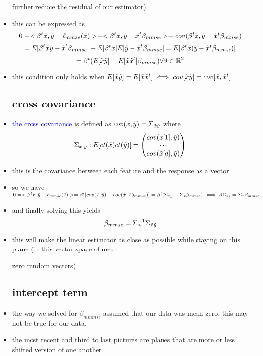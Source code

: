 \documentclass{article}
\begin{document}
\begin{itemize}
further reduce the residual of our estimator)
\item this can be expressed as $$0=<\beta^t\Tilde{x}, \Tilde{y}-\ell_{mmse}(\Tilde{x})>=
<\beta^t\Tilde{x}, \Tilde{y}-\Tilde{x}^t\beta_{mmse}>=cov(\beta^t\Tilde{x}, \Tilde{y}-\Tilde{x}^t\beta_{mmse})$$
$$=E[\beta^t\Tilde{x} \Tilde{y}-\Tilde{x}^t\beta_{mmse}]-E[\beta^t\Tilde{x}] E[\Tilde{y}-\Tilde{x}^t\beta_{mmse}]
=E[\beta^t\Tilde{x}(\Tilde{y}-\Tilde{x}^t\beta_{mmse})]$$ $$=\beta^t(E[\Tilde{x}\Tilde{y}]-E[\Tilde{x}\Tilde{x}^t]\beta_{mmse})\forall \beta \in \mathbb{R}^2$$
\item this condition only holds when $E[\Tilde{x}\Tilde{y}]=E[\Tilde{x}\Tilde{x}^t]\iff cov[\Tilde{x}\Tilde{y}]=cov[\Tilde{x} ,\Tilde{x}^t]$
\subsection*{cross covariance}
\item \textcolor{blue}{the cross covariance} is defined as $cov(\Tilde{x}, \Tilde{y})=\Sigma_{\Tilde{x}\Tilde{y}}$ where 
$$\Sigma_{\Tilde{x}, \Tilde{y}}:E[ct(\Tilde{x})ct(\Tilde{y})]=\begin{pmatrix}
    cov(\Tilde{x[1]}, \Tilde{y})\\ \cdots \\ cov(\Tilde{x}[d], \tilde{y})
\end{pmatrix}$$
\item this is the covariance between each feature and the response as a vector 
\item so we have $0=<\beta^t\Tilde{x}, \tilde{y}-\ell_{mmse}(\Tilde{x})>=\beta^t[cov(\Tilde{x}, \Tilde{y}) - cov(\Tilde{x},\Tilde{x} \beta_{mmse})]=\beta^t(\Sigma_{\Tilde{x}\Tilde{y}}-\Sigma_{\Tilde{x}} \beta_{mmse})\iff \beta\Sigma_{\Tilde{x}\Tilde{y}}=\Sigma_{\Tilde{x}}\beta_{mmse}$
\item and finally solving this yields $$\beta_{mmse}=\Sigma_{\Tilde{x}}^{-1}\Sigma_{\Tilde{x}\Tilde{y}}$$
\item this will make the linear estimator as close as possible while staying on this plane (in this vector space of mean 

zero random vectors)
\subsection*{intercept term}
\item the way we solved for $\beta_{mmmse}$ assumed that our data was mean zero, this may not be true for our data. 
\item the most recent and third to last pictures are planes that are more or less shifted version of one another 

\end{itemize}
\end{document}
